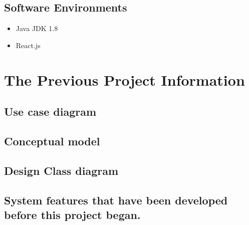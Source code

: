 \documentclass[12pt, a4paper]{article}
\begin{document}
\begin{CJK*}{UTF8}{bkai}
  \subsection{Software Environments}
    \begin{itemize}
      \item Java JDK 1.8
      \item React.js
    \end{itemize}
\section{The Previous Project Information}
  \subsection{Use case diagram}

  \subsection{Conceptual model}

  \subsection{Design Class diagram}

  \subsection{System features that have been developed before this project began.}
\end{CJK*}
\end{document}
